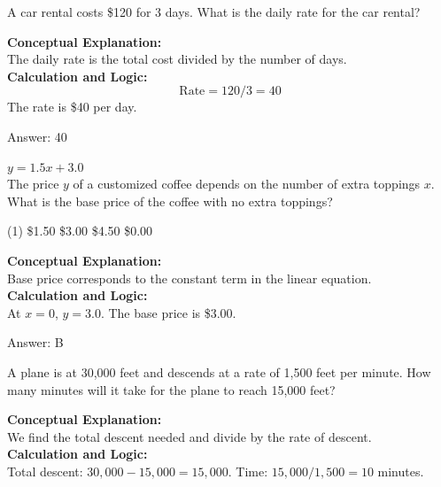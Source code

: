 \documentclass[11pt,paper=a4,answers]{exam}
\begin{document}
\begin{questions}
\question
A car rental costs \$120 for 3 days. What is the daily rate for the car rental?

\begin{solution}
\textbf{Conceptual Explanation:} \\
The daily rate is the total cost divided by the number of days.
\\[10pt]
\textbf{Calculation and Logic:} \\
\[\text{Rate} = 120 / 3 = 40\]
The rate is \$40 per day.

\vspace{15pt}
Answer: \colorbox{yellow!100}{40}
\end{solution}

\question
$y = 1.5x + 3.0$ \\
The price $y$ of a customized coffee depends on the number of extra toppings $x$. What is the base price of the coffee with no extra toppings?
\begin{tasks}(1)
    \task \$1.50
    \task \$3.00
    \task \$4.50
    \task \$0.00
\end{tasks}

\begin{solution}
\textbf{Conceptual Explanation:} \\
Base price corresponds to the constant term in the linear equation.
\\[10pt]
\textbf{Calculation and Logic:} \\
At $x = 0$, $y = 3.0$. The base price is \$3.00.

\vspace{15pt}
Answer: \colorbox{yellow!100}{B}
\end{solution}

\question
A plane is at 30,000 feet and descends at a rate of 1,500 feet per minute. How many minutes will it take for the plane to reach 15,000 feet?

\begin{solution}
\textbf{Conceptual Explanation:} \\
We find the total descent needed and divide by the rate of descent.
\\[10pt]
\textbf{Calculation and Logic:} \\
Total descent: $30,000 - 15,000 = 15,000$.
Time: $15,000 / 1,500 = 10$ minutes.


\end{solution}
\end{questions}
\end{document}
